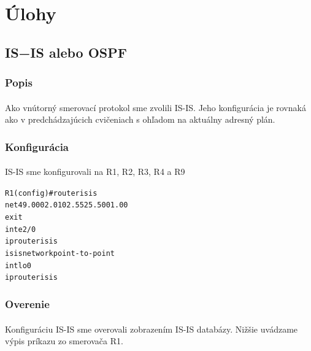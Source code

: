 \documentclass[12pt,twoside,a4paper]{report}
\begin{document}
\section{Úlohy}
\subsection{IS−IS alebo OSPF}
\subsubsection{Popis}
\paragraph{}
Ako vnútorný smerovací protokol sme zvolili IS-IS. Jeho konfigurácia je rovnaká ako v predchádzajúcich cvičeniach s ohľadom na aktuálny adresný plán.

\subsubsection{Konfigurácia}
\paragraph{}
IS-IS sme konfigurovali na R1, R2, R3, R4 a R9

\noindent
{\selectfont
\begin{small}
\begin{alltt}
R1(config)#router isis
  net 49.0002.0102.5525.5001.00
  exit
int e2/0
  ip router isis
  isis network point-to-point
int lo0
  ip router isis
\end{alltt}
\end{small}
}

\subsubsection{Overenie}
\paragraph{}
Konfiguráciu IS-IS sme overovali zobrazením IS-IS databázy. Nižšie uvádzame výpis príkazu  zo smerovača R1.
\end{document}
